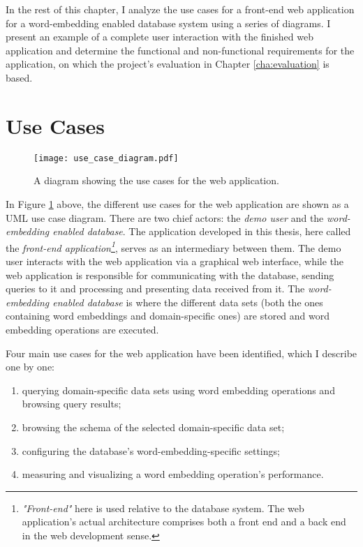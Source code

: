 In the rest of this chapter, I analyze the use cases for a front-end web application for a word-embedding enabled database system using a series of diagrams. I present an example of a complete user interaction with the finished web application and determine the functional and non-functional requirements for the application, on which the project's evaluation in Chapter \ref{cha:evaluation} is based. 

\section{Use Cases}
\label{sec:use_case}
\begin{figure}
	\texttt{[image: use\_case\_diagram.pdf]}
	\caption{A diagram showing the use cases for the web application.}
	\label{fig:use_case_diagram}
\end{figure}

In Figure \ref{fig:use_case_diagram} above, the different use cases for the web application are shown as a UML use case diagram. There are two chief actors: the \textit{demo user} and the \textit{word-embedding enabled database}. The application developed in this thesis, here called the \textit{front-end application\footnote{\textit{"Front-end"} here is used relative to the database system. The web application's actual architecture comprises both a front end and a back end in the web development sense.}}, serves as an intermediary between them. The demo user interacts with the web application via a graphical web interface, while the web application is responsible for communicating with the database, sending queries to it and processing and presenting data received from it. The \textit{word-embedding enabled database} is where the different data sets (both the ones containing word embeddings and domain-specific ones) are stored and word embedding operations are executed.

Four main use cases for the web application have been identified, which I describe one by one:

\begin{enumerate}[label=U\arabic*]
	\item querying domain-specific data sets using word embedding operations and browsing query results;
	\item browsing the schema of the selected domain-specific data set;
	\item configuring the database's word-embedding-specific settings;
	\item measuring and visualizing a word embedding operation's performance.
\end{enumerate}


